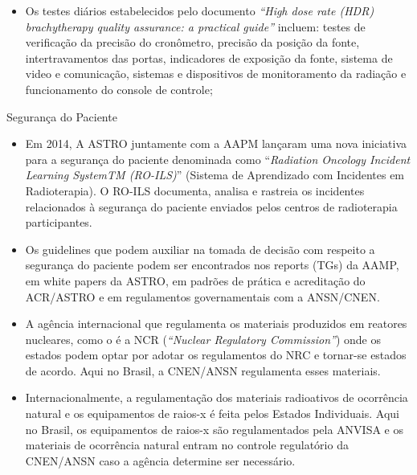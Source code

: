 \documentclass[11pt,a4paper]{article}
\newcounter{exemplo}
\begin{document}
\begin{exemplo}[11. Qualidade ]
\begin{itemize}
        \item Os testes diários estabelecidos pelo documento  \textit{``High dose rate (HDR) brachytherapy quality assurance: a practical guide''} incluem: testes de verificação da precisão do cronômetro, precisão da posição da fonte, intertravamentos das portas, indicadores de exposição da fonte, sistema de video e comunicação, sistemas e dispositivos de monitoramento da radiação e funcionamento do console de controle;
      
    \end{itemize}

    \textcolor{CarnationPink}{Segurança do Paciente}
    \begin{itemize}
        \item Em 2014, A ASTRO juntamente com a AAPM lançaram uma nova iniciativa para a segurança do paciente denominada como ``\textit{Radiation Oncology Incident Learning SystemTM (RO-ILS)}'' (Sistema de Aprendizado com Incidentes em Radioterapia). O RO-ILS documenta, analisa e rastreia os incidentes relacionados à segurança do paciente enviados pelos centros de radioterapia participantes. 
        
        \item Os guidelines que podem auxiliar na tomada de decisão com respeito a segurança do paciente podem ser encontrados nos reports (TGs) da AAMP, em white papers da ASTRO, em padrões de prática e acreditação do ACR/ASTRO e em regulamentos governamentais com a ANSN/CNEN.
        
        \item A agência internacional que regulamenta os materiais produzidos em reatores nucleares, como o  é a NCR (\textit{``Nuclear Regulatory Commission''}) onde os estados podem optar por adotar os regulamentos do NRC e tornar-se estados de acordo. Aqui no Brasil, a CNEN/ANSN regulamenta esses materiais.

        \item Internacionalmente, a regulamentação dos materiais radioativos de ocorrência natural e os equipamentos de raios-x é feita pelos Estados Individuais. Aqui no Brasil, os equipamentos de raios-x são regulamentados pela ANVISA e os materiais de ocorrência natural entram no controle regulatório da CNEN/ANSN caso a agência determine ser necessário.
        

\end{itemize}
\end{exemplo}
\end{document}
